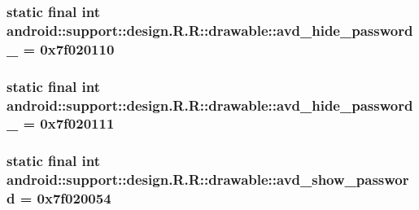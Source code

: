\hypertarget{classandroid_1_1support_1_1design_1_1_r_1_1drawable_532e4cdecccd475e73440c65af67071d}{
\subsubsection[{avd\_\-hide\_\-password\_\-2}]{\setlength{\rightskip}{0pt plus 5cm}static final int android::support::design.R.R::drawable::avd\_\-hide\_\-password\_ = 0x7f020110}}
\label{classandroid_1_1support_1_1design_1_1_r_1_1drawable_532e4cdecccd475e73440c65af67071d}


\hypertarget{classandroid_1_1support_1_1design_1_1_r_1_1drawable_d41935a41c1c6c525a9b13fe6de37315}{
\subsubsection[{avd\_\-hide\_\-password\_\-3}]{\setlength{\rightskip}{0pt plus 5cm}static final int android::support::design.R.R::drawable::avd\_\-hide\_\-password\_ = 0x7f020111}}
\label{classandroid_1_1support_1_1design_1_1_r_1_1drawable_d41935a41c1c6c525a9b13fe6de37315}


\hypertarget{classandroid_1_1support_1_1design_1_1_r_1_1drawable_292c1bd8ce93c83e7f626bec7a1e83fe}{
\subsubsection[{avd\_\-show\_\-password}]{\setlength{\rightskip}{0pt plus 5cm}static final int android::support::design.R.R::drawable::avd\_\-show\_\-password = 0x7f020054}}
\label{classandroid_1_1support_1_1design_1_1_r_1_1drawable_292c1bd8ce93c83e7f626bec7a1e83fe}


